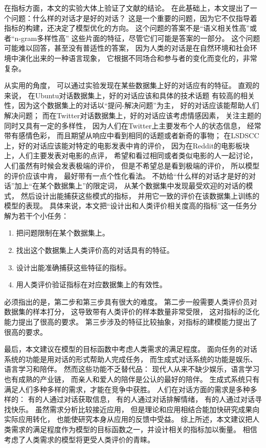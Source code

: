 在指标方面，本文的实验大体上验证了文献\cite{HowNot}的结论。
在此基础上，本文提出了一个问题：什么样的对话才是好的对话？
这是一个重要的问题，因为它不仅指导着指标的构建，还决定了模型优化的方向。
这个问题的答案不是“语义相关性高”或者“n-gram多样性高”
这些片面的特征，尽管它们可能是答案的一部分。
这个问题可能难以回答，甚至没有普适性的答案，
因为人类的对话是在自然环境和社会环境中演化出来的一种语言现象，
它根据不同场合和参与者的变化而变化的，非常复杂。

从实用的角度，
可以通过实验发现在某些数据集上好的对话应有的特征。
直观的来说，
在Ubuntu对话数据集上，好的对话应该和具体的技术话题
有较高的相关性，因为这个数据集上的对话以“提问-解决问题”为主，
好的对话应该能帮助人们解决问题；
而在Twitter对话数据集上，好的对话应该考虑情感因素，
关注主题的同时又具有一定的多样性，
因为人们在Twitter上主要发布个人的状态信息，
经常带有感情色彩，
而且期望从响应中看到相同的话题或者新奇的事物；
在LSDSCC上，好的对话应该能对特定的电影发表中肯的评价，
因为在Reddit的电影板块上，人们主要发表对电影的点评，
希望和看过相同或者类似电影的人一起讨论，
人们虽然有时候会发表极端的评价，
但是不希望总是看到极端的评价，
所以模型的评价应该中肯，
最好带有一点个性化看法。
不妨给“什么样的对话才是好的对话”加上“在某个数据集上”的限定词，
从某个数据集中发现最受欢迎的对话的模式，
然后设计出能捕获这些模式的指标，
并用它一致的评价在该数据集上训练的模型的表现。
具体来说，本文把“设计出和人类评价相关度高的指标”这一任务分解为若干个小任务：
\begin{enumerate}
    \item 把问题限制在某个数据集上。
    \item 找出这个数据集上人类评价高的对话具有的特征。
    \item 设计出能准确捕获这些特征的指标。
    \item 用人类评价验证指标在对应数据集上的有效性。
\end{enumerate}

必须指出的是，第二步和第三步具有很大的难度。
第二步一般需要人类评价员对数据集的样本打分，
这导致带有人类评价的样本数量非常受限，
这对指标的泛化能力提出了很高的要求。
第三步涉及的特征比较抽象，对指标的建模能力提出了很高的要求。

最后，本文建议在模型的目标函数中考虑人类需求的满足程度。
面向任务的对话系统的功能是用对话的形式帮助人完成任务，
而生成式对话系统的功能是娱乐、语言学习和陪伴。
然而这些功能不乏替代品：
现代人从来不缺少娱乐，语言学习也有成熟的产业链，
而亲人和爱人的陪伴是公认的最好的陪伴。
生成式系统只有满足人们多种多样的需求，才能在竞争中获胜。
人们在对话方面的需求是多种多样的：
有的人通过对话获取信息，
有的人通过对话排解情绪，
有的人通过对话寻找快乐。
虽然需求分析比较接近应用，
但是理论和应用相结合能加快研究成果向实际应用转化，
也能使研究本身从应用的反馈中受益。
综上所述，本文建议把人类需求的满足程度作为模型的目标函数之一，并设计相关的指标加以衡量。
相信考虑了人类需求的模型将更受人类评价的青睐。
